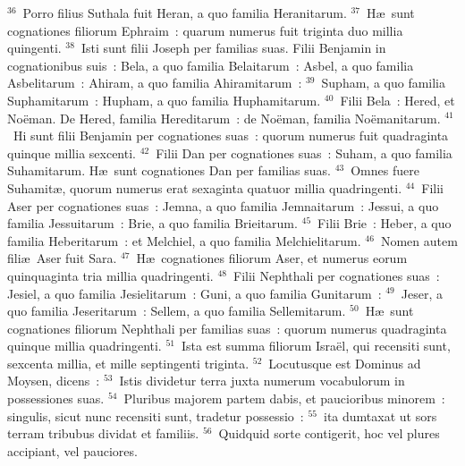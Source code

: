 ${}^{36}$~Porro filius Suthala fuit Heran, a quo familia Heranitarum.
${}^{37}$~H\ae\ sunt cognationes filiorum Ephraim~: quarum numerus fuit triginta duo millia quingenti.
${}^{38}$~Isti sunt filii Joseph per familias suas. Filii Benjamin in cognationibus suis~: Bela, a quo familia Belaitarum~: Asbel, a quo familia Asbelitarum~: Ahiram, a quo familia Ahiramitarum~:
${}^{39}$~Supham, a quo familia Suphamitarum~: Hupham, a quo familia Huphamitarum.
${}^{40}$~Filii Bela~: Hered, et No\"eman. De Hered, familia Hereditarum~: de No\"eman, familia No\"emanitarum.
${}^{41}$~Hi sunt filii Benjamin per cognationes suas~: quorum numerus fuit quadraginta quinque millia sexcenti.
${}^{42}$~Filii Dan per cognationes suas~: Suham, a quo familia Suhamitarum. H\ae\ sunt cognationes Dan per familias suas.
${}^{43}$~Omnes fuere Suhamit\ae , quorum numerus erat sexaginta quatuor millia quadringenti.
${}^{44}$~Filii Aser per cognationes suas~: Jemna, a quo familia Jemnaitarum~: Jessui, a quo familia Jessuitarum~: Brie, a quo familia Brieitarum.
${}^{45}$~Filii Brie~: Heber, a quo familia Heberitarum~: et Melchiel, a quo familia Melchielitarum.
${}^{46}$~Nomen autem fili\ae\ Aser fuit Sara.
${}^{47}$~H\ae\ cognationes filiorum Aser, et numerus eorum quinquaginta tria millia quadringenti.
${}^{48}$~Filii Nephthali per cognationes suas~: Jesiel, a quo familia Jesielitarum~: Guni, a quo familia Gunitarum~:
${}^{49}$~Jeser, a quo familia Jeseritarum~: Sellem, a quo familia Sellemitarum.
${}^{50}$~H\ae\ sunt cognationes filiorum Nephthali per familias suas~: quorum numerus quadraginta quinque millia quadringenti.
${}^{51}$~Ista est summa filiorum Isra\"el, qui recensiti sunt, sexcenta millia, et mille septingenti triginta.
${}^{52}$~Locutusque est Dominus ad Moysen, dicens~:
${}^{53}$~Istis dividetur terra juxta numerum vocabulorum in possessiones suas.
${}^{54}$~Pluribus majorem partem dabis, et paucioribus minorem~: singulis, sicut nunc recensiti sunt, tradetur possessio~:
${}^{55}$~ita dumtaxat ut sors terram tribubus dividat et familiis.
${}^{56}$~Quidquid sorte contigerit, hoc vel plures accipiant, vel pauciores.


